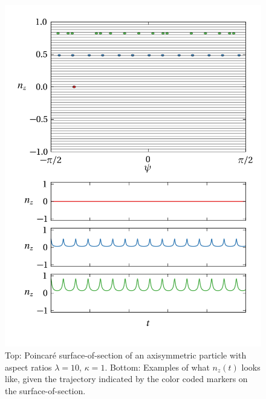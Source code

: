 \documentclass[thesis.tex]{subfiles}
\begin{document}
\begin{figure}
\includegraphics[width=12cm]{figs/poincareA.png}%
\caption{\label{fig:poincareA} Top: Poincar\'e surface-of-section of an axisymmetric particle with aspect ratios $\lambda=10$, $\kappa=1$. Bottom: Examples of what $n_z(t)$ looks like, given the trajectory indicated by the color coded markers on the surface-of-section.}%
\end{figure}
\end{document}
